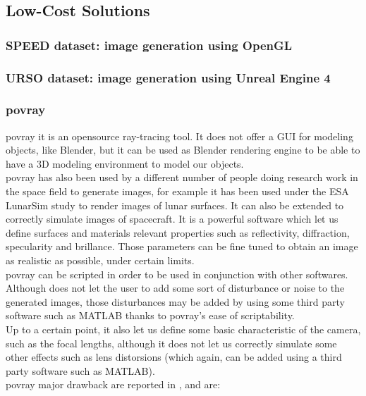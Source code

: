 \subsection{Low-Cost Solutions}

\subsubsection{SPEED dataset: image generation using OpenGL}

\subsubsection{URSO dataset: image generation using Unreal Engine 4}

\subsubsection{\acrshort{povray}}
\acrshort{povray} it is an opensource ray-tracing tool. It does not offer a GUI for modeling objects, like Blender, but it can be used as Blender rendering engine to be able to have a 3D modeling environment to model our objects. \\
\acrshort{povray} has also been used by a different number of people doing research work in the space field to generate images, for example it has been used under the ESA LunarSim study to render images of lunar surfaces. It can also be extended to correctly simulate images of spacecraft. It is a powerful software which let us define surfaces and materials relevant properties such as reflectivity, diffraction, specularity and brillance. Those parameters can be fine tuned to obtain an image as realistic as possible, under certain limits.\\
\acrshort{povray} can be scripted in order to be used in conjunction with other softwares.\\
Although does not let the user to add some sort of disturbance or noise to the generated images, those disturbances may be added by using some third party software such as MATLAB thanks to \acrshort{povray}'s ease of scriptability.\\
Up to a certain point, it also let us define some basic characteristic of the camera, such as the focal lengths, although it does not let us correctly simulate some other effects such as lens distorsions (which again, can be added using a third party software such as MATLAB).\\
\acrshort{povray} major drawback are reported in \cite{pangufinal}, and are:
